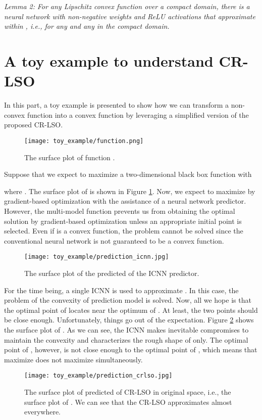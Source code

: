 \documentclass[10pt,twocolumn,letterpaper]{article}
\begin{document}
\emph{Lemma 2:} \emph{For any Lipschitz convex function  over a compact domain, there is a neural network  with non-negative weights and ReLU activations that approximate  within , i.e.,  for any  and any  in the compact domain.}
\section{A toy example to understand CR-LSO}
In this part, a toy example is presented to show how we can transform a non-convex function into a convex function by leveraging a simplified version of the proposed CR-LSO. 
\begin{figure}[htbp]
	\centering
	\texttt{[image: toy\_example/function.png]}
	\caption{The surface plot of function .}
	\label{fig:target_function}
\end{figure}
Suppose that we expect to maximize a two-dimensional black box function  with

where . The surface plot of  is shown in Figure \ref{fig:target_function}.
Now, we expect to maximize  by gradient-based optimization with the assistance of a neural network predictor. However, the multi-model
function  prevents us from obtaining the optimal solution by gradient-based optimization unless an appropriate initial point is selected. Even if  is a convex function, the problem cannot be solved since the conventional neural network is not guaranteed to be a convex function. 
\begin{figure}[htbp]
	\centering
	\texttt{[image: toy\_example/prediction\_icnn.jpg]}
	\caption{The surface plot of the predicted  of the ICNN predictor.}
	\label{fig:prediction_icnn}
\end{figure}

For the time being, a single ICNN  is used to approximate . In this case, the problem of the convexity of prediction model is solved. Now, all we hope is that the optimal point of  locates near the optimum of . At least, the two points should be close enough. Unfortunately, things go out of the expectation. Figure \ref{fig:prediction_icnn} shows the surface plot of . As we can see, the ICNN makes inevitable compromises to maintain the convexity and characterizes the rough shape of  only. The optimal point of , however, is not close enough to the optimal point of , which means that maximize  does not maximize  simultaneously. 
\begin{figure}[htbp]
	\centering
	\texttt{[image: toy\_example/prediction\_crlso.jpg]}
	\caption{The surface plot of predicted  of CR-LSO in original space, i.e., the surface plot of . We can see that the CR-LSO approximates  almost everywhere.}
	\label{fig:prediction_crlso}
\end{figure}
\end{document}
